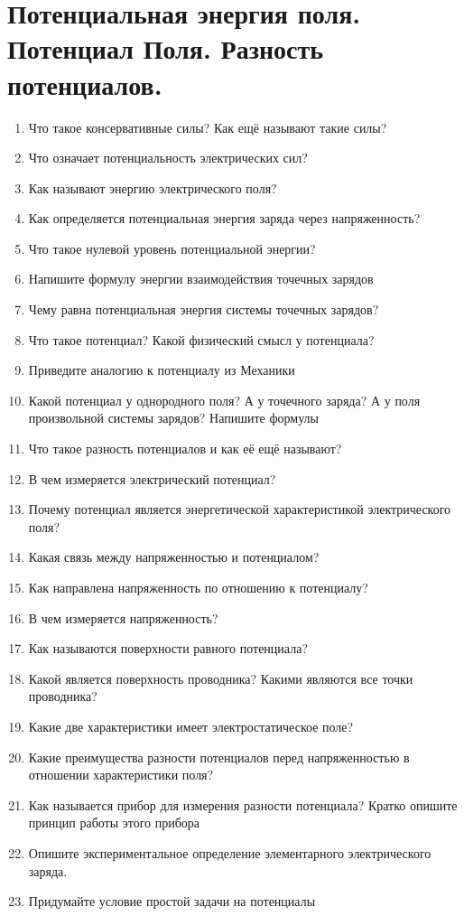 \documentclass[12pt,a4paper]{report}
\begin{document}
\section{Потенциальная энергия поля. Потенциал Поля. Разность потенциалов.}
\begin{enumerate}
\item Что такое консервативные силы? Как ещё называют такие силы?
\item Что означает потенциальность электрических сил? 
\item Как называют энергию электрического поля?
\item Как определяется потенциальная энергия заряда через напряженность?
\item Что такое нулевой уровень потенциальной энергии?
\item Напишите формулу энергии взаимодействия точечных зарядов
\item Чему равна потенциальная энергия системы точечных зарядов?
\item Что такое потенциал? Какой физический смысл у потенциала?
\item Приведите аналогию к потенциалу из Механики
\item Какой потенциал у однородного поля? А у точечного заряда?  А у поля произвольной системы зарядов? Напишите формулы
\item Что такое разность потенциалов и как её ещё называют?
\item В чем измеряется электрический потенциал?
\item Почему потенциал является энергетической характеристикой электрического поля?
\item Какая связь между напряженностью и потенциалом?
\item Как направлена напряженность по отношению к потенциалу?
\item В чем измеряется напряженность?
\item Как называются поверхности равного потенциала?
\item Какой является поверхность проводника? Какими являются все точки проводника?
\item Какие две характеристики имеет электростатическое поле?
\item Какие преимущества разности потенциалов перед напряженностью в отношении характеристики поля?
\item Как называется прибор для измерения разности потенциала? Кратко опишите принцип работы этого прибора
\item Опишите экспериментальное определение элементарного электрического заряда.
\item Придумайте условие простой задачи на потенциалы
\end{enumerate}
\end{document}
